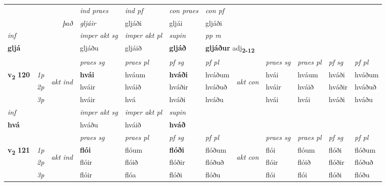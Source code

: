 \begin{longtable}[l]{X>{\footnotesize\itshape}llXXXXlXXXX}
   && &  \textit{ind praes} & \textit{ind pf} & \textit{con praes} & \textit{con pf} \\*
\multicolumn{3}{r}{\textit{það}} & gljáir & gljáði & gljái & gljáði \\*

\cmidrule{4-7}
   {\textit{inf}} & &  & \textit{imper akt sg} & \textit{imper akt pl}    & \textit{supin}  & \textit{pp m} \\*
  {\textbf{gljá}} & && gljáðu  & gljáið    &  \textbf{gljáð}  & \multicolumn{2}{l}{\textbf{gljáður} adj\textbf{\textsubscript{2-12}}} \\*

\midrule

 & &   & \textit{praes sg}  & \textit{praes pl}    & \textit{ pf sg} & \textit{pf pl} & & \textit{praes sg}  & \textit{praes pl}    & \textit{pf sg} & \textit{pf pl }  \\ \cmidrule{4-7} \cmidrule{9-12}
 \multirow{2}{*}{{{\textbf{v{\textsubscript{2}}} \Large{\textbf{120}}}}}  & 1p & \multirow{3}{*}{\begin{turn}{90}\textit{akt ind}\end{turn}} & \textbf{hvái} & hváum & \textbf{hváði} & hváðum & \multirow{3}{*}{\begin{turn}{90}\textit{akt con}\end{turn}} &hvái & hváum & hváði & hváðum\\*
 & 2p &  &  hváir  & hváið & hváðir & hváðuð & & hváir & hváið & hváðir & hváðuð \\*
 & 3p &  & hváir & hvá & hváði & hváðu & & hvái & hvái& hváði & hváðu \\*
\cmidrule{4-7} \cmidrule{9-12}

   {\textit{inf}} & &  & \textit{imper akt sg} & \textit{imper akt pl}    & \textit{supin}   \\*
  {\textbf{hvá}} & && hváðu  & hváið    &  \textbf{hváð}   \\*

\midrule

 & &   & \textit{praes sg}  & \textit{praes pl}    & \textit{ pf sg} & \textit{pf pl} & & \textit{praes sg}  & \textit{praes pl}    & \textit{pf sg} & \textit{pf pl }  \\ \cmidrule{4-7} \cmidrule{9-12}
 \multirow{2}{*}{{{\textbf{v{\textsubscript{2}}} \Large{\textbf{121}}}}}  & 1p & \multirow{3}{*}{\begin{turn}{90}\textit{akt ind}\end{turn}} & \textbf{flói} & flóum & \textbf{flóði} & flóðum & \multirow{3}{*}{\begin{turn}{90}\textit{akt con}\end{turn}} &flói & flóum & flóði & flóðum\\*
 & 2p &  &  flóir  & flóið & flóðir & flóðuð & & flóir & flóið & flóðir & flóðuð \\*
 & 3p &  & flóir & flóa & flóði & flóðu & & flói & flói& flóði & flóðu \\*
\cmidrule{4-7} \cmidrule{9-12}


\end{longtable}
